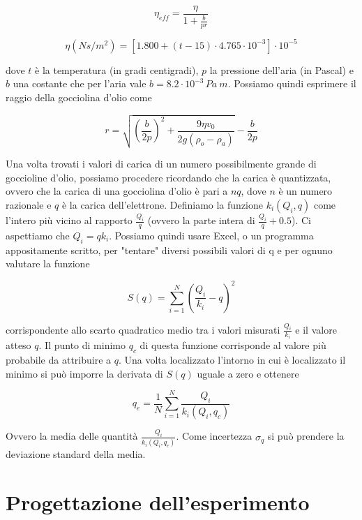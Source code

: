 \documentclass{article}
\begin{document}
\begin{equation}
\eta _{e\!f\!f} =\frac{\eta}{1+\frac{b}{pr}}
\end{equation}

\begin{equation}
\eta (N s/m^2) =[1.800+(t-15)\cdot 4.765 \cdot10^{-3}]\cdot 10^{-5}
\end{equation}

dove $t$ è la temperatura (in gradi centigradi), $p$ la pressione dell'aria (in Pascal) e $b$ una costante che per l'aria vale $b=8.2\cdot10^{-3} \,Pa\:m$. Possiamo quindi esprimere il raggio della gocciolina d'olio come

\begin{equation}
r=\sqrt{\left( \frac{b}{2p} \right)^2 + \frac{9\eta v_0}{2g(\rho _o - \rho _a)}}-\frac{b}{2p}
\label{raggio}
\end{equation}

Una volta trovati i valori di carica di un numero possibilmente grande di goccioline d'olio, possiamo procedere ricordando che la carica è quantizzata, ovvero che la carica di una gocciolina d'olio è pari a $nq$, dove $n$ è un numero razionale e $q$ è la carica dell'elettrone. Definiamo la funzione $k_i (Q_i, q)$ come l'intero più vicino al rapporto $\frac{Q_i}{q}$ (ovvero la parte intera di $\frac{Q_i}{q}+0.5$). Ci aspettiamo che $Q_i = qk_i$. Possiamo quindi usare Excel, o un programma appositamente scritto, per "tentare" diversi possibili valori di q e per ognuno valutare la funzione

\begin{equation}
S(q)=\sum_{i=1}^{N}{\left( \frac{Q_i}{k_i} - q \right)^2}
\label{Anal1}
\end{equation}

corrispondente allo scarto quadratico medio tra i valori misurati $\frac{Q_i}{k_i}$ e il valore atteso $q$. Il punto di minimo $q_c$ di questa funzione corrisponde al valore più probabile da attribuire a $q$. Una volta localizzato l'intorno in cui è localizzato il minimo si può imporre la derivata di $S(q)$ uguale a zero e ottenere 

\begin{equation}
q_e=\frac{1}{N} \sum_{i=1}^{N}{\frac{Q_i}{k_i(Q_i,q_c)}}
\label{Anal2}
\end{equation}

Ovvero la media delle quantità $\frac{Q_i}{k_i(Q_i,q_c)}$. Come incertezza $\sigma _q$ si può prendere la deviazione standard della media.

\pagebreak
\section{Progettazione dell'esperimento}
\end{document}
